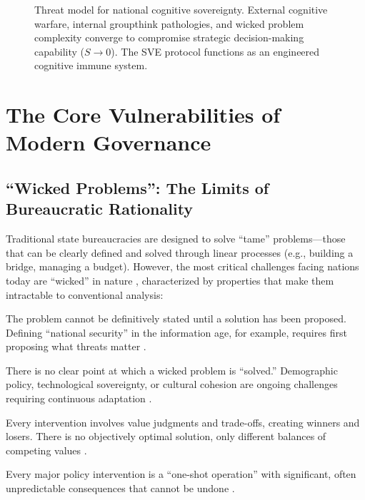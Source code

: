 \documentclass[11pt,a4paper]{article}
\begin{document}
\begin{small}
\begin{figure}[h!]
\begin{tikzpicture}[scale=1.2]
\end{tikzpicture}
\caption{Threat model for national cognitive sovereignty. External cognitive warfare, internal groupthink pathologies, and wicked problem complexity converge to compromise strategic decision-making capability ($S \to 0$). The SVE protocol functions as an engineered cognitive immune system.}
\label{fig:threat_model}
\end{figure}

\section{The Core Vulnerabilities of Modern Governance}
\subsection{``Wicked Problems'': The Limits of Bureaucratic Rationality}
Traditional state bureaucracies are designed to solve ``tame'' problems—those that can be clearly defined and solved through linear processes (e.g., building a bridge, managing a budget). However, the most critical challenges facing nations today are ``wicked'' in nature \citep{Rittel1973}, characterized by properties that make them intractable to conventional analysis:

\begin{description}[style=nextline]
    \item[\textbf{Ambiguous Definition}] The problem cannot be definitively stated until a solution has been proposed. Defining ``national security'' in the information age, for example, requires first proposing what threats matter \citep[lines 556--557, 743--744]{AnalyticalReport2025}.
    
    \item[\textbf{No Stopping Rule}] There is no clear point at which a wicked problem is ``solved.'' Demographic policy, technological sovereignty, or cultural cohesion are ongoing challenges requiring continuous adaptation \citep[lines 556--557, 745--746]{AnalyticalReport2025}.
    
    \item[\textbf{Solutions are ``Good/Bad,'' not ``True/False''}] Every intervention involves value judgments and trade-offs, creating winners and losers. There is no objectively optimal solution, only different balances of competing values \citep[lines 556--557, 747--748]{AnalyticalReport2025}.
    
    \item[\textbf{High Stakes and Irreversibility}] Every major policy intervention is a ``one-shot operation'' with significant, often unpredictable consequences that cannot be undone \citep[lines 556--557, 752--753]{AnalyticalReport2025}.
\end{description}


\end{small}
\end{document}
